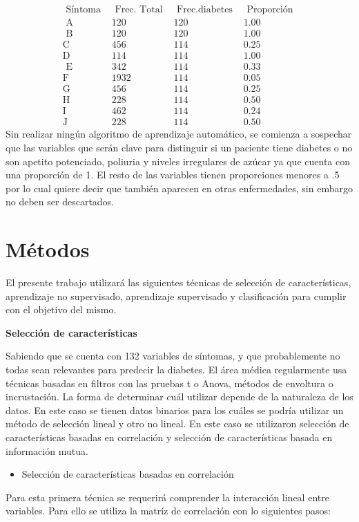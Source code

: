 \documentclass[twocolumn]{bmcart}%
\begin{document}
$$
\begin{array}{rrrr}
\text { Síntoma } & \text { Frec. Total } & \text { Frec.diabetes } & \text { Proporción } \\
\hline \text { A } & 120 & 120 & 1.00 \\
\text { B } & 120 & 120 & 1.00 \\
\text {C } & 456 & 114 & 0.25 \\
\text {D } & 114 & 114 & 1.00 \\
\text { E } & 342 & 114 & 0.33 \\
\text {F } & 1932 & 114 & 0.05 \\
\text {G } & 456 & 114 & 0.25 \\
\text {H } & 228 & 114 & 0.50 \\
\text {I} & 462 & 114 & 0.24 \\
\text {J } & 228 & 114 & 0.50
\end{array}
$$
Sin realizar ningún algoritmo de aprendizaje automático, se comienza a sospechar que las variables que serán clave para distinguir si un paciente tiene diabetes o no son apetito potenciado, poliuria y  niveles irregulares de azúcar ya que cuenta con una proporción de 1. El resto de las variables tienen proporciones menores a .5 por lo cual quiere decir que también aparecen en otras enfermedades, sin embargo no deben ser descartados. 

\section*{Métodos}
El presente trabajo utilizará las siguientes técnicas de selección de características, aprendizaje no supervisado, aprendizaje supervisado y clasificación para cumplir con el objetivo del mismo.


\textbf{Selección de características}

Sabiendo que se cuenta con 132 variables de síntomas, y que probablemente no todas sean relevantes para predecir la diabetes. El área médica regularmente usa técnicas basadas en filtros con las pruebas t o Anova, métodos de envoltura o incrustación. La forma de determinar cuál utilizar depende de la naturaleza de los datos. En este caso se tienen datos binarios para los cuáles se podría utilizar un método de selección lineal y otro no lineal. En este caso se utilizaron selección de características basadas en correlación y  selección de características basada en información mutua. 

\begin{itemize}
    \item Selección de características basadas en correlación
\end{itemize}
Para esta primera técnica se requerirá comprender la interacción lineal entre variables. Para ello se utiliza la matríz de correlación con lo siguientes pasos: 
\end{document}
